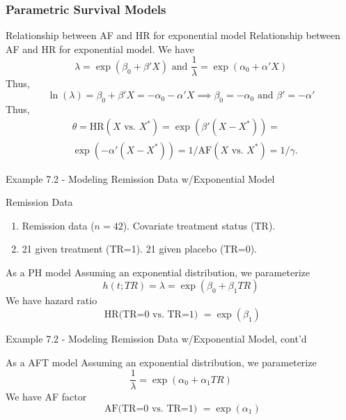 \documentclass{beamer}
\theoremstyle{definition}
\begin{document}
\begin{frame}
\frametitle{Parametric Survival Models}
\begin{block}{Relationship between AF and HR for exponential model}
Relationship between AF and HR for exponential model. We have
\[
\lambda = \exp(\beta_0 + \beta'X) \text{ and } \frac{1}{\lambda} = \exp(\alpha_0 + \alpha'X)
\]
Thus,
\[ \ln(\lambda) = \beta_0 + \beta'X = -\alpha_0 - \alpha'X \implies \beta_0 = -\alpha_0 \text{ and } \beta'=-\alpha' \]
Thus,
\begin{align*}
&\theta = \text{HR}(X \text{ vs. } X^*) = \exp(\beta'(X - X^*)) =\\
&\exp(-\alpha'(X - X^*)) = 1/\text{AF}(X \text{ vs. } X^*) = 1/\gamma.
\end{align*}
\end{block}
\end{frame}

\begin{frame}{Example 7.2 - Modeling Remission Data w/Exponential Model}
\begin{block}{Remission Data}
\begin{enumerate}[ ]
\item Remission data ($n=42$). Covariate treatment status (TR).
\item 21 given treatment (TR=1). 21 given placebo (TR=0).
\end{enumerate}
\end{block}
\begin{block}{As a PH model}
Assuming an exponential distribution, we parameterize
\[ h(t;TR)= \lambda = \exp(\beta_0 + \beta_1 TR)
\]
We have hazard ratio
\[
\text{ HR(TR=0 vs. TR=1) } = \exp(\beta_1)
\]
 \end{block}
 \end{frame}

\begin{frame}{Example 7.2 - Modeling Remission Data w/Exponential Model, cont'd}
\begin{block}{As a AFT model}
Assuming an exponential distribution, we parameterize
\[ \frac{1}{\lambda} = \exp(\alpha_0 + \alpha_1 TR)
\]
We have AF factor
\[
\text{ AF(TR=0 vs. TR=1) } = \exp(\alpha_1)
\]
 \end{block}
 \end{frame}
\end{document}
